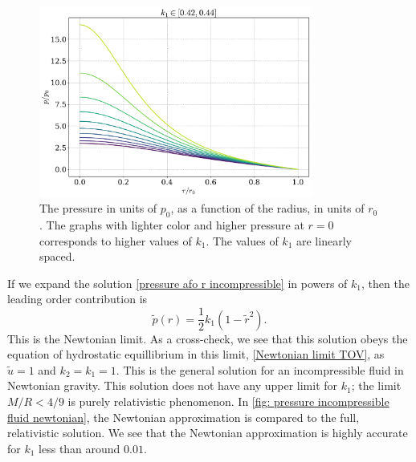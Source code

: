 \begin{figure}[h]
    \centering
    \includegraphics[width=0.8\textwidth]{../scripts/figurer/incompressible.pdf}
    \caption{The pressure in units of $p_0$, as a function of the radius, in units of $r_0$. The graphs with lighter color and higher pressure at $r = 0$ corresponds to higher values of $k_1$. The values of $k_1$ are linearly spaced.}
    \label{fig: pressure incompressible fluid}
\end{figure}

 
If we expand the solution \autoref{pressure afo r incompressible} in powers of $k_1$, then the leading order contribution is
%
\begin{equation}
    \tilde p(r) = \frac{1}{2} k_1 (1 - \tilde r^2).
\end{equation}
%
This is the Newtonian limit.
As a cross-check, we see that this solution obeys the equation of hydrostatic equillibrium in this limit, \autoref{Newtonian limit TOV}, as $\tilde u = 1$ and $k_2 = k_1 = 1$.
This is the general solution for an incompressible fluid in Newtonian gravity.
This solution does not have any upper limit for $k_1$; the limit $M/R < 4 / 9$ is purely relativistic phenomenon.
In \autoref{fig: pressure incompressible fluid newtonian}, the Newtonian approximation is compared to the full, relativistic solution.
We see that the Newtonian approximation is highly accurate for $k_1$ less than around $0.01$.


